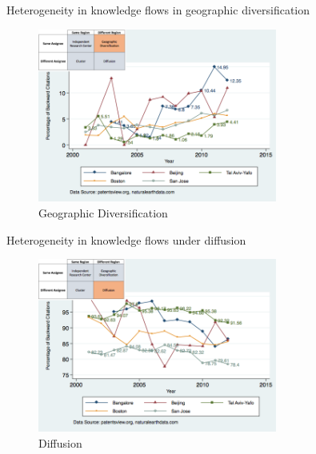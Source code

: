 \documentclass{beamer}
\begin{document}
\begin{frame}{Heterogeneity in knowledge flows in geographic diversification}
\begin{figure}[h]
\begin{centering}
  \includegraphics[width=0.7\textwidth]{SMSDiffRegionSameAssigneeFlows.png}
  \caption{Geographic Diversification}
   \label{fig:SMSDiffRegionSameAssigneeFlows}
\end{centering}
\end{figure}
\end{frame}

\begin{frame}{Heterogeneity in knowledge flows under diffusion}
\begin{figure}[h]
\begin{centering}
  \includegraphics[width=0.7\textwidth]{SMSDiffRegionDiffAssigneeFlows.png}
  \caption{Diffusion}
   \label{fig:SMSDiffRegionDiffAssigneeFlows}
\end{centering}
\end{figure}
\end{frame}
\end{document}
